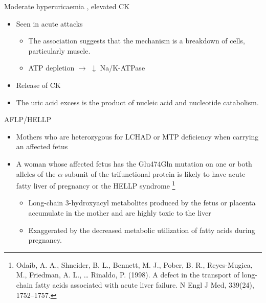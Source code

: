 \documentclass[presentation, smaller]{beamer}
\begin{document}
\begin{frame}[label={sec:orgheadline18}]{Moderate hyperuricaemia , elevated CK}
\begin{itemize}
\item Seen in acute attacks 
\begin{itemize}
\item The association suggests that the mechanism is a breakdown of
cells, particularly muscle.
\item ATP depletion \(\to\) \(\downarrow\) Na/K-ATPase
\end{itemize}
\item Release of CK
\item The uric acid excess is the product of nucleic acid and nucleotide catabolism.
\end{itemize}
\end{frame}

\begin{frame}[label={sec:orgheadline19}]{AFLP/HELLP}
\begin{itemize}
\item Mothers who are heterozygous for LCHAD or MTP deficiency when
carrying an affected fetus
\item A woman whose affected fetus has the Glu474Gln mutation on one or
both alleles of the \(\alpha\)-subunit of the trifunctional protein is
likely to have acute fatty liver of pregnancy or the HELLP syndrome \footnote{Odaib, A. A., Shneider, B. L., Bennett, M. J., Pober, B. R.,
Reyes-Mugica, M., Friedman, A. L., … Rinaldo, P. (1998). A defect in
the transport of long-chain fatty acids associated with acute liver
failure. N Engl J Med, 339(24), 1752–1757.}
\begin{itemize}
\item Long-chain 3-hydroxyacyl metabolites produced by the fetus or
placenta accumulate in the mother and are highly toxic to the liver
\item Exaggerated by the decreased metabolic utilization of fatty acids
during pregnancy.
\end{itemize}
\end{itemize}
\end{frame}
\end{document}
